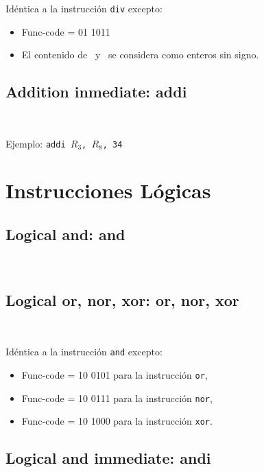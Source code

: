 \documentclass[12pt]{amsart}
\begin{document}
	Idéntica a la instrucción \texttt{div} excepto:
	\begin{itemize}
		\item Func-code = 01 1011
		\item El contenido de \Rs\ y \Rt\ se considera como enteros sin signo.
	\end{itemize}

	\subsection{Addition inmediate: \textbf{addi}}\ 
	
	
	
	\medskip
	Ejemplo: \texttt{addi $R_3$, $R_8$, 34}

	\section{Instrucciones Lógicas}
	
	\subsection{Logical and: \textbf{and}}\ 
	
	
	
	\subsection{Logical or, nor, xor: \textbf{or, nor, xor}}\ 
	
	Idéntica a la instrucción \texttt{and} excepto:
	\begin{itemize}
		\item Func-code = 10 0101 para la instrucción \texttt{or},
		\item Func-code = 10 0111 para la instrucción \texttt{nor},
		\item Func-code = 10 1000 para la instrucción \texttt{xor}.
	\end{itemize}

	\subsection{Logical and immediate: \textbf{andi}}\ 
	
\end{document}
